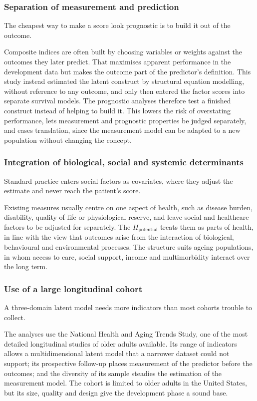 \subsubsection{Separation of measurement and prediction}

The cheapest way to make a score look prognostic is to build it out of the
outcome.

Composite indices are often built by choosing variables or weights against the outcomes they later predict. That maximises apparent performance in the development data but makes the outcome part of the predictor's definition. This study instead estimated the latent construct by structural equation modelling, without reference to any outcome, and only then entered the factor scores into separate survival models. The prognostic analyses therefore test a finished construct instead of helping to build it. This lowers the risk of overstating performance, lets measurement and prognostic properties be judged separately, and eases translation, since the measurement model can be adapted to a new population without changing the concept.

\subsubsection{Integration of biological, social and systemic determinants}

Standard practice enters social factors as covariates, where they adjust the
estimate and never reach the patient's score.

Existing measures usually centre on one aspect of health, such as disease burden, disability, quality of life or physiological reserve, and leave social and healthcare factors to be adjusted for separately. The $H_{\text{potential}}$ treats them as parts of health, in line with the view that outcomes arise from the interaction of biological, behavioural and environmental processes. The structure suits ageing populations, in whom access to care, social support, income and multimorbidity interact over the long term.

\subsubsection{Use of a large longitudinal cohort}

A three-domain latent model needs more indicators than most cohorts trouble to
collect.

The analyses use the National Health and Aging Trends Study, one of the most detailed longitudinal studies of older adults available. Its range of indicators allows a multidimensional latent model that a narrower dataset could not support; its prospective follow-up places measurement of the predictor before the outcomes; and the diversity of its sample steadies the estimation of the measurement model. The cohort is limited to older adults in the United States, but its size, quality and design give the development phase a sound base.

